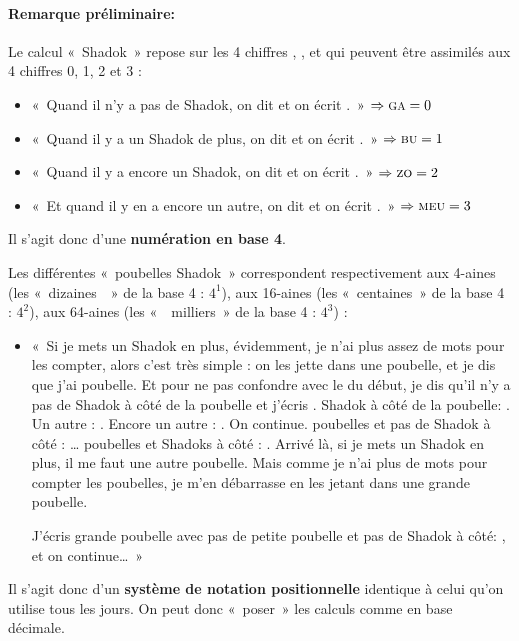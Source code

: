 \paragraph{Remarque préliminaire:} Le calcul «~Shadok~» repose sur les 4 chiffres \ga, \bu, \zo{} et \meu{} qui peuvent \^etre assimilés aux 4 chiffres 0, 1, 2 et 3 : 
\begin{itemize} 
\item «~Quand il n'y a pas de Shadok, on dit \ga{} et on écrit \ga{}.~» \hfill$\Rightarrow \textsc{ga}{} = 0$
\item «~Quand il y a un Shadok de plus, on dit \bu{} et on écrit \bu{}.~» 
\hfill$\Rightarrow \textsc{bu}{} = 1$
\item «~Quand il y a encore un Shadok, on dit \zo{} et on écrit \zo{}.~» 
\hfill$\Rightarrow \textsc{zo}{} = 2$
\item «~Et quand il y en a encore un autre, on dit \meu{} et on écrit \meu{}.~» 
\hfill$\Rightarrow \textsc{meu}{} = 3$
\end{itemize} 
Il s'agit donc d'une \textbf{numération en base 4}.

Les différentes «~poubelles Shadok~» correspondent respectivement
aux 4-aines (les «~dizaines~~» de la base 4 : $4^1$), 
aux 16-aines (les «~centaines~» de la base 4 : $4^2$), 
aux 64-aines (les «~~milliers~» de la base 4 : $4^3$) :
\begin{itemize}
\item «~Si je mets un Shadok en plus, évidemment, je n'ai plus assez 
de mots pour les compter, alors c'est très simple : on les jette dans une poubelle, 
et je dis que j'ai \bu{} poubelle. 
Et pour ne pas confondre avec le \bu{} du début, 
je dis qu'il n'y a pas de Shadok à côté de la poubelle et j'écris \bu{} \ga{}. 
\bu{} Shadok à côté de la poubelle: \bu{} \bu{}. Un autre : \bu{}  \zo{}. Encore un autre : \bu{} \meu{}. 
On continue. \zo{} poubelles et pas de Shadok à côté : \zo{} \ga{}\ldots{} 
\meu{} poubelles et \meu{} Shadoks à côté : \meu{} \meu{}. 
Arrivé là, si je mets un Shadok en plus, il me faut une autre poubelle. 
Mais comme je n'ai plus de mots pour compter les poubelles, je m'en débarrasse 
en les jetant dans une grande poubelle. 

J'écris \bu{} grande poubelle avec pas de petite poubelle 
et pas de Shadok à côté: \bu{} \ga{} \ga{}, et on continue\ldots{}~»
\end{itemize}
Il s'agit donc d'un \textbf{système de notation positionnelle} identique
à celui qu'on utilise tous les jours. On peut donc «~poser~» 
les calculs comme en base décimale.

